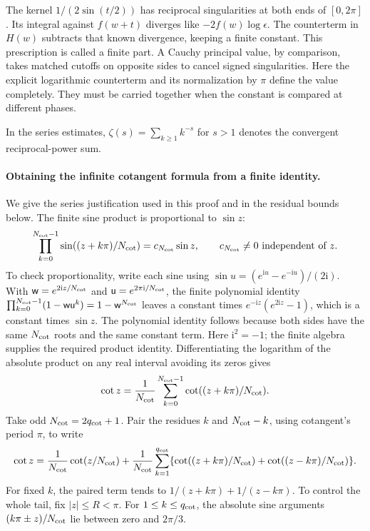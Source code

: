The kernel $1/(2\sin(t/2))$ has reciprocal singularities at both
ends of $[0,2\pi]$. Its integral against $f(w+t)$ diverges like
$-2f(w)\log\epsilon$. The counterterm in $H(w)$ subtracts that known
divergence, keeping a finite constant. This prescription is called a
finite part. A Cauchy principal value, by comparison, takes matched
cutoffs on opposite sides to cancel signed singularities. Here the
explicit logarithmic counterterm and its normalization by $\pi$
define the value completely. They must be carried together when the
constant is compared at different phases.

In the series estimates, $\zeta(s)=\sum_{k\geq1}k^{-s}$ for $s>1$
denotes the convergent reciprocal-power sum.

\paragraph{Obtaining the infinite cotangent formula from a finite identity.}
We give the series justification used in this proof and in the residual
bounds below. The finite sine product is proportional to $\sin z$:
\[
 \prod_{k=0}^{N_{\rm cot}-1}\sin((z+k\pi)/N_{\rm cot})=c_{N_{\rm cot}}\sin z,
 \qquad c_{N_{\rm cot}}\ne0\ \text{independent of }z.
\]
To check proportionality, write each sine using
$\sin u=(e^{\mathrm i u}-e^{-\mathrm i u})/(2\mathrm i)$.
With $\mathsf{w}=e^{2\mathrm iz/N_{\rm cot}}$ and $\mathsf{u}=e^{2\pi\mathrm i/N_{\rm cot}}$,
the finite polynomial identity
$\prod_{k=0}^{N_{\rm cot}-1}(1-\mathsf{w}\mathsf{u}^k)=1-\mathsf{w}^{N_{\rm cot}}$ leaves a constant times
$e^{-\mathrm iz}(e^{2\mathrm iz}-1)$, which is a constant times
$\sin z$. The polynomial identity follows because both sides have
the same $N_{\rm cot}$ roots and the same constant term. Here
$\mathrm i^2=-1$; the finite algebra supplies the required product identity. Differentiating the logarithm of the
absolute product on any real interval avoiding its zeros gives
\[
 \cot z=\frac{1}{N_{\rm cot}}\sum_{k=0}^{N_{\rm cot}-1}\cot((z+k\pi)/N_{\rm cot}).
\]
Take odd $N_{\rm cot}=2q_{\rm cot}+1$. Pair the residues $k$ and $N_{\rm cot}-k$, using cotangent's
period $\pi$, to write
\[
 \cot z=\frac{1}{N_{\rm cot}}\cot(z/N_{\rm cot})
   +\frac{1}{N_{\rm cot}}\sum_{k=1}^{q_{\rm cot}}
       \{\cot((z+k\pi)/N_{\rm cot})+\cot((z-k\pi)/N_{\rm cot})\}.
\]
For fixed $k$, the paired term tends to
$1/(z+k\pi)+1/(z-k\pi)$. To control the whole tail, fix
$|z|\leq R<\pi$. For $1\leq k\leq q_{\rm cot}$, the absolute sine
arguments $(k\pi\pm z)/N_{\rm cot}$ lie between zero and $2\pi/3$.
